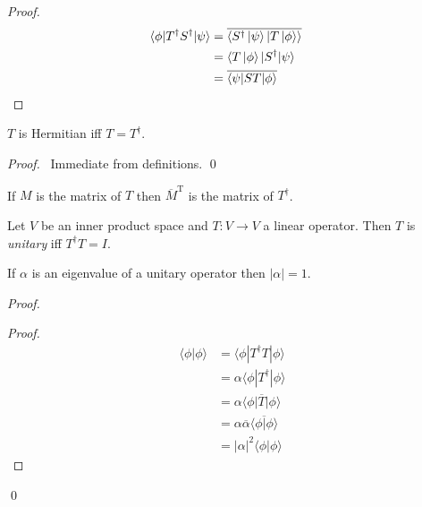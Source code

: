\begin{proof}
\pf
\begin{align*}
\langle \phi | T^\dagger S^\dagger | \psi \rangle
& = \overline{\langle S^\dagger \left| {\psi} \right\rangle | T \left| {\phi} \right\rangle \rangle} \\
& = \langle T \left| {\phi} \right\rangle | S^\dagger | \psi \rangle \\
& = \overline{\langle \psi | S T | \phi \rangle} & \relax
\end{align*}
\end{proof}

\begin{prop}
$T$ is Hermitian iff $T = T^\dagger$.
\end{prop}

\begin{proof}
\pf\ Immediate from definitions. \qed
\end{proof}

\begin{prop}
If $M$ is the matrix of $T$ then $\overline{M}^\mathrm{T}$ is the matrix of $T^\dagger$.
\end{prop}

\begin{df}[Unitary]
Let $V$ be an inner product space and $T : V \rightarrow V$ a linear operator. Then $T$ is \emph{unitary} iff $T^\dagger T = I$.
\end{df}

\begin{prop}
If $\alpha$ is an eigenvalue of a unitary operator then $|\alpha| = 1$.
\end{prop}

\begin{proof}
\pf
{}
\begin{proof}
	\pf
	\begin{align*}
		\langle \phi | \phi \rangle
		& = \langle \phi | T^\dagger T | \phi \rangle \\
		& = \alpha \langle \phi | T^\dagger | \phi \rangle \\
		& = \alpha \overline{\langle \phi | T | \phi \rangle} \\
		& = \alpha \overline{\alpha} \overline{\langle \phi | \phi \rangle} \\
		& = |\alpha|^2 \langle \phi | \phi \rangle
	\end{align*}
\end{proof}
\qed
\end{proof}

